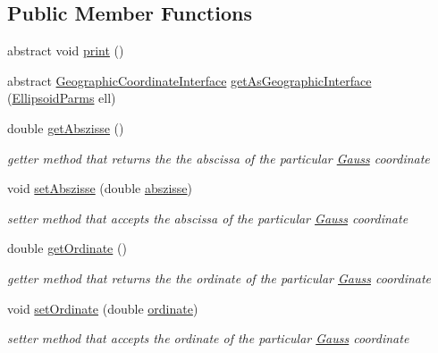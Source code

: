 \subsection*{Public Member Functions}
\begin{DoxyCompactItemize}
\item 
abstract void \hyperlink{classcoordinates_1_1_gauss_aa088aa6fb796aa873b19ee2c1ef42468}{print} ()
\item 
abstract \hyperlink{classcoordinates_1_1_geographic_coordinate_interface}{Geographic\+Coordinate\+Interface} \hyperlink{classcoordinates_1_1_gauss_adb944679772bf8b4101b075247dd0fd0}{get\+As\+Geographic\+Interface} (\hyperlink{classparams_1_1_ellipsoid_parms}{Ellipsoid\+Parms} ell)
\item 
double \hyperlink{classcoordinates_1_1_gauss_ad11601b119b190bd9d61f71df6b53038}{get\+Abszisse} ()
\begin{DoxyCompactList}\small\item\em getter method that returns the the abscissa of the particular \hyperlink{classcoordinates_1_1_gauss}{Gauss} coordinate \end{DoxyCompactList}\item 
void \hyperlink{classcoordinates_1_1_gauss_a82bc0ee0a9fae9bef4e3400615d50c58}{set\+Abszisse} (double \hyperlink{classcoordinates_1_1_gauss_a9bd37a096f53a9e443570ec5748f95d8}{abszisse})
\begin{DoxyCompactList}\small\item\em setter method that accepts the abscissa of the particular \hyperlink{classcoordinates_1_1_gauss}{Gauss} coordinate \end{DoxyCompactList}\item 
double \hyperlink{classcoordinates_1_1_gauss_a751c889d6cc9b2acb5eeb42d888efc0f}{get\+Ordinate} ()
\begin{DoxyCompactList}\small\item\em getter method that returns the the ordinate of the particular \hyperlink{classcoordinates_1_1_gauss}{Gauss} coordinate \end{DoxyCompactList}\item 
void \hyperlink{classcoordinates_1_1_gauss_a3afbbdd05c3a68dd778760cb824b0b03}{set\+Ordinate} (double \hyperlink{classcoordinates_1_1_gauss_ab156b1da518d7637dacef40489a0dba4}{ordinate})
\begin{DoxyCompactList}\small\item\em setter method that accepts the ordinate of the particular \hyperlink{classcoordinates_1_1_gauss}{Gauss} coordinate \end{DoxyCompactList}\item 

\end{DoxyCompactItemize}
